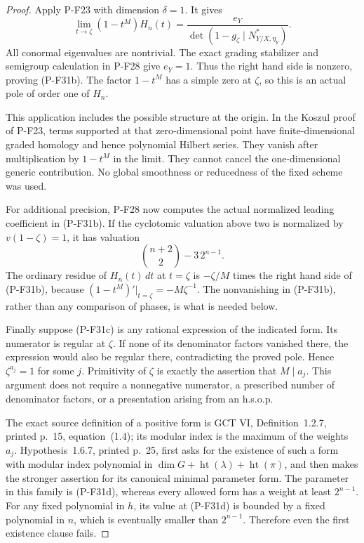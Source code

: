 \begin{proof}
Apply P-F23 with dimension $\delta=1$. It gives
\[
 \lim_{t\to\zeta}(1-t^M)H_n(t)
   =\frac{e_Y}{\det(1-g_\zeta\mid N^*_{Y/X,\eta_Y})}.
 \tag{P-F31f}
\]
All conormal eigenvalues are nontrivial. The exact grading
stabilizer and semigroup calculation in P-F28 give $e_Y=1$.
Thus the right hand side is nonzero, proving (P-F31b).
The factor $1-t^M$ has a simple zero at $\zeta$, so this is
an actual pole of order one of $H_n$.

This application includes the possible structure at the
origin. In the Koszul proof of P-F23, terms supported at
that zero-dimensional point have finite-dimensional graded
homology and hence polynomial Hilbert series. They vanish
after multiplication by $1-t^M$ in the limit. They cannot
cancel the one-dimensional generic contribution. No global
smoothness or reducedness of the fixed scheme was used.

For additional precision, P-F28 now computes the actual
normalized leading coefficient in (P-F31b). If the cyclotomic
valuation above two is normalized by $v(1-\zeta)=1$, it has
valuation
\[
 \binom{n+2}{2}-3\,2^{n-1}.
 \tag{P-F31g}
\]
The ordinary residue of $H_n(t)\,dt$ at $t=\zeta$ is
$-\zeta/M$ times the right hand side of (P-F31b), because
$(1-t^M)'|_{t=\zeta}=-M\zeta^{-1}$. The nonvanishing
in (P-F31b), rather than any comparison of phases, is
what is needed below.

Finally suppose (P-F31c) is any rational expression of
the indicated form. Its numerator is regular at $\zeta$.
If none of its denominator factors vanished there, the
expression would also be regular there, contradicting
the proved pole. Hence $\zeta^{a_j}=1$ for some $j$.
Primitivity of $\zeta$ is exactly the assertion that
$M\mid a_j$. This argument does not require a nonnegative
numerator, a prescribed number of denominator factors,
or a presentation arising from an h.s.o.p.

The exact source definition of a positive form is
GCT VI, Definition~1.2.7, printed p.~15, equation~(1.4);
its modular index is the maximum of the weights $a_j$.
Hypothesis~1.6.7, printed p.~25, first asks for the
existence of such a form with modular index polynomial
in $\dim G+\operatorname{ht}(\lambda)+\operatorname{ht}(\pi)$,
and then makes the stronger assertion for its canonical
minimal parameter form. The parameter in this family is
(P-F31d), whereas every allowed form has a weight at
least $2^{n-1}$. For any fixed polynomial in $h$, its
value at (P-F31d) is bounded by a fixed polynomial in
$n$, which is eventually smaller than $2^{n-1}$.
Therefore even the first existence clause fails.
\end{proof}

